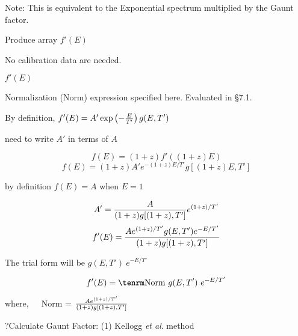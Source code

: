 {\listlist 
 
Note: This is equivalent to the Exponential spectrum multiplied by the
Gaunt factor.
                                                                                                                                    

Produce array $f'(E)$


}

{\parindent \vbox{}}

{\listlist
 
No calibration data are needed.


$f'(E)$

Normalization (Norm) expression specified here. Evaluated in \S7.1.


By definition, $f'(E) = A' \exp \left( - {E \over T'} \right) g(E,T')$

need to write $A'$ in terms of $A$

}

$$f(E) = (1+z)f'((1+z)E)$$
$$f(E) = (1+z)A'e^{-(1+z)E/T'} g[(1+z)E, T']$$

\itemitem{}by definition $f(E) = A$ when $E = 1$

$$A' = {A \over {(1+z)g[(1+z),T']}} e^{(1+z)/T'}$$
$$f'(E) = {A e^{(1+z)/T'} g(E,T') e^{-E/T'}\over {(1+z)g[(1+z),T']}}$$

\itemitem{}The trial form will be $g(E,T')~e^{-E/T'}$

$$f'(E) = {\rm Norm}~g(E,T')~e^{-E/T'}$$

\itemitem{}where,~~~Norm = ${A e^{(1+z)/T'} \over {(1+z) g[(1+z),T']}}$

\??Calculate Gaunt Factor: (1) Kellogg {\it et al}. method


